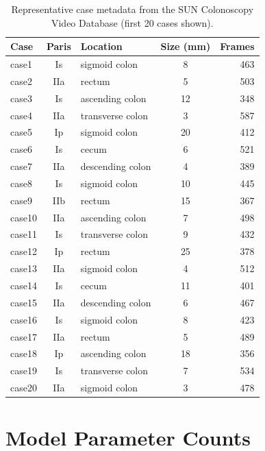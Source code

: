 \begin{table}[htbp]
	\caption{Representative case metadata from the SUN Colonoscopy Video Database (first 20 cases shown).}
	\label{tab:case_metadata}
	\centering
	\small
	\begin{tabular}{lclcr}
		\toprule
		\textbf{Case} & \textbf{Paris} & \textbf{Location} & \textbf{Size (mm)} & \textbf{Frames} \\
		\midrule
		case1  & Is  & sigmoid colon    & 8  & 463  \\
		case2  & IIa & rectum           & 5  & 503  \\
		case3  & Is  & ascending colon  & 12 & 348  \\
		case4  & IIa & transverse colon & 3  & 587  \\
		case5  & Ip  & sigmoid colon    & 20 & 412  \\
		case6  & Is  & cecum            & 6  & 521  \\
		case7  & IIa & descending colon & 4  & 389  \\
		case8  & Is  & sigmoid colon    & 10 & 445  \\
		case9  & IIb & rectum           & 15 & 367  \\
		case10 & IIa & ascending colon  & 7  & 498  \\
		case11 & Is  & transverse colon & 9  & 432  \\
		case12 & Ip  & rectum           & 25 & 378  \\
		case13 & IIa & sigmoid colon    & 4  & 512  \\
		case14 & Is  & cecum            & 11 & 401  \\
		case15 & IIa & descending colon & 6  & 467  \\
		case16 & Is  & sigmoid colon    & 8  & 423  \\
		case17 & IIa & rectum           & 5  & 489  \\
		case18 & Ip  & ascending colon  & 18 & 356  \\
		case19 & Is  & transverse colon & 7  & 534  \\
		case20 & IIa & sigmoid colon    & 3  & 478  \\
		\bottomrule
	\end{tabular}
\end{table}


\section{Model Parameter Counts}
\label{sec:app:params}

